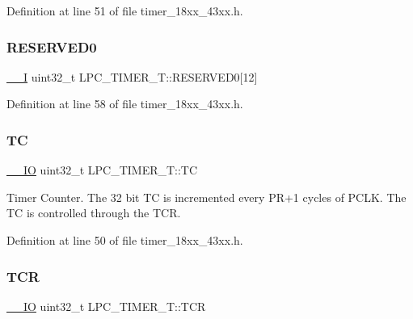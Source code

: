 Definition at line 51 of file timer\+\_\+18xx\+\_\+43xx.\+h.

\mbox{\label{struct_l_p_c___t_i_m_e_r___t_ac55f208ad800371ff9db0ba9f49ec716}} 
\subsubsection{\texorpdfstring{R\+E\+S\+E\+R\+V\+E\+D0}{RESERVED0}}
{\footnotesize\ttfamily \hyperlink{core__sc300_8h_af63697ed9952cc71e1225efe205f6cd3}{\+\_\+\+\_\+I} uint32\+\_\+t L\+P\+C\+\_\+\+T\+I\+M\+E\+R\+\_\+\+T\+::\+R\+E\+S\+E\+R\+V\+E\+D0\mbox{[}12\mbox{]}}



Definition at line 58 of file timer\+\_\+18xx\+\_\+43xx.\+h.

\mbox{\label{struct_l_p_c___t_i_m_e_r___t_ac92507831988bc15ddc0fbc30ab31bf9}} 
\subsubsection{\texorpdfstring{TC}{TC}}
{\footnotesize\ttfamily \hyperlink{core__sc300_8h_aec43007d9998a0a0e01faede4133d6be}{\+\_\+\+\_\+\+IO} uint32\+\_\+t L\+P\+C\+\_\+\+T\+I\+M\+E\+R\+\_\+\+T\+::\+TC}

Timer Counter. The 32 bit TC is incremented every P\+R+1 cycles of P\+C\+LK. The TC is controlled through the T\+CR. 

Definition at line 50 of file timer\+\_\+18xx\+\_\+43xx.\+h.

\mbox{\label{struct_l_p_c___t_i_m_e_r___t_ab6f7507a9fa9ac19e6ffb35f766027bb}} 
\subsubsection{\texorpdfstring{T\+CR}{TCR}}
{\footnotesize\ttfamily \hyperlink{core__sc300_8h_aec43007d9998a0a0e01faede4133d6be}{\+\_\+\+\_\+\+IO} uint32\+\_\+t L\+P\+C\+\_\+\+T\+I\+M\+E\+R\+\_\+\+T\+::\+T\+CR}

